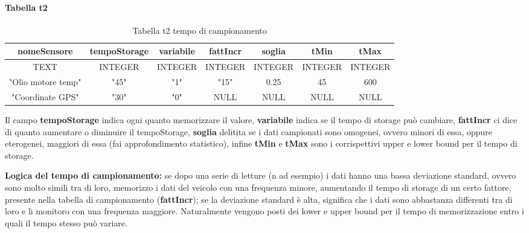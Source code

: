 \documentclass[12pt, a4paper, italian]{report}
\numberwithin{figure}{chapter}
\numberwithin{table}{chapter}
\begin{document}
\paragraph{Tabella t2}
\begin{table}[h!]
  \centering 
  \begin{adjustbox}{max width=\textwidth}
    \begin{tabular}{|c|c|c|c|c|c|c|}
      \hline
      \textbf{nomeSensore} & \textbf{tempoStorage} & \textbf{variabile} & \textbf{fattIncr} & \textbf{soglia} & \textbf{tMin} & \textbf{tMax} \\
      \hline
      TEXT & INTEGER & INTEGER & INTEGER & INTEGER & INTEGER & INTEGER \\
      \hline
      "Olio motore temp" & "45" & "1" & "15" & 0.25 & 45 & 600 \\
      \hline
      "Coordinate GPS" & "30" & "0" & NULL & NULL & NULL & NULL \\
      \hline
    \end{tabular}
  \end{adjustbox}
  \caption{Tabella t2 tempo di campionamento}
  \label{tab:t2 campionamento}
\end{table}
Il campo \textbf{tempoStorage} indica ogni quanto memorizzare il valore, \textbf{variabile} indica se il tempo di storage può cambiare, \textbf{fattIncr} ci dice di quanto aumentare o diminuire il tempoStorage, \textbf{soglia} delitita se i dati campionati sono omogenei, ovvero minori di essa, oppure eterogenei, maggiori di essa (fai approfondimento statistico), infine \textbf{tMin} e \textbf{tMax} sono i corrispettivi upper e lower bound per il tempo di storage.

\textbf{Logica del tempo di campionamento:} se dopo una serie di letture (n ad esempio) i dati hanno una bassa deviazione standard, ovvero sono molto simili tra di loro, memorizzo i dati del veicolo con una frequenza minore, aumentando il tempo di storage di un certo fattore, presente nella tabella di campionamento (\textbf{fattIncr}); se la deviazione standard è alta, significa che i dati sono abbastanza differenti tra di loro e li monitoro con una frequenza maggiore. Naturalmente vengono posti dei lower e upper bound per il tempo di memorizzazione entro i quali il tempo stesso può variare.
\end{document}
